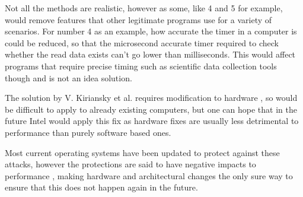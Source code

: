 \documentclass[12pt]{article}
\begin{document}
Not all the methods are realistic, however as some, like 4 and 5 for example, would remove features that other legitimate programs use for a variety of scenarios. For number 4 as an example, how accurate the timer in a computer is could be reduced, so that the microsecond accurate timer required to check whether the read data exists can't go lower than milliseconds. This would affect programs that require precise timing such as scientific data collection tools though and is not an idea solution.

The solution by V. Kiriansky et al. requires modification to hardware \cite[Sec.~3]{Paper:DAWG}, so would be difficult to apply to already existing computers, but one can hope that in the future Intel would apply this fix as  hardware fixes are usually less detrimental to performance than purely software based ones.

Most current operating systems have been updated to protect against these attacks, however the protections are said to have negative impacts to performance \cite{DigitalFoundry:PatchingVid}, making hardware and architectural changes the only sure way to ensure that this does not happen again in the future.

\printbibliography
\end{document}
